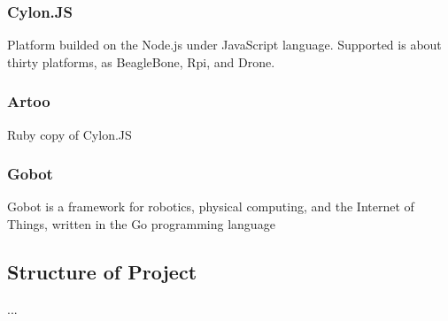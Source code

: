 \subsubsection{Cylon.JS}

Platform builded on the Node.js under JavaScript language. Supported is about thirty platforms, as BeagleBone, Rpi, and Drone.

\subsubsection{Artoo}

Ruby copy of Cylon.JS

\subsubsection{Gobot}

Gobot is a framework for robotics, physical computing, and the Internet of Things, written in the Go programming language

\subsection{Structure of Project}

...